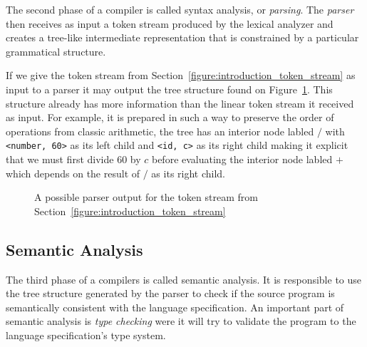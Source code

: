 \documentclass[
  english,
  lmodern,
  oneside
]{ufsc-thesis-rn46-2019/ufsc-thesis-rn46-2019}
\begin{document}
The second phase of a compiler is called syntax analysis, or \textit{parsing}.
The \textit{parser} then receives as input a token stream produced by the lexical analyzer and creates a tree-like intermediate representation that is constrained by a particular grammatical structure.


If we give the token stream from Section~\ref{figure:introduction_token_stream} as input to a parser it may output the tree structure found on Figure~\ref{figure:introduction_ast}.
This structure already has more information than the linear token stream it received as input.
For example, it is prepared in such a way to preserve the order of operations from classic arithmetic, the tree has an interior node labled $/$ with \verb+<number, 60>+ as its left child and \verb+<id, c>+ as its right child making it explicit that we must first divide $60$ by $c$ before evaluating the interior node labled $+$ which depends on the result of $/$ as its right child.

\begin{figure}
\caption{A possible parser output for the token stream from Section~\ref{figure:introduction_token_stream}}\label{figure:introduction_ast}
\centering
{}
\end{figure}

\subsection{Semantic Analysis}

The third phase of a compilers is called semantic analysis.
It is responsible to use the tree structure generated by the parser to check if the source program is semantically consistent with the language specification.
An important part of semantic analysis is \textit{type checking} were it will try to validate the program to the language specification's type system.
\end{document}
